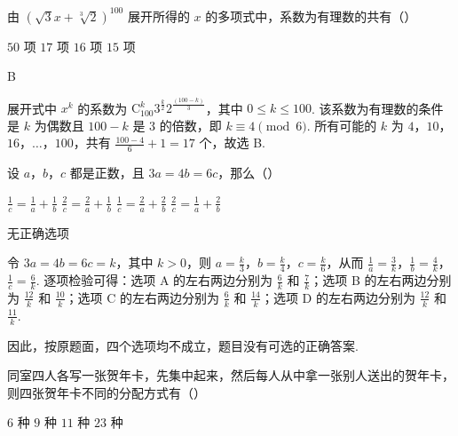 \begin{problem}
由 \((\sqrt{3}x + \sqrt[3]{2})^{100}\) 展开所得的 \(x\) 的多项式中，系数为有理数的共有（\quad）

\choices
    {\(50\) 项}
    {\(17\) 项}
    {\(16\) 项}
    {\(15\) 项}
\end{problem}

\begin{answer}
B
\end{answer}

\begin{solution}
展开式中 \(x^k\) 的系数为
\(\mathrm C_{100}^{k}3^{\frac{k}{2}}2^{\frac{(100-k)}{3}}\)，其中 \(0\leqslant k\leqslant100\). 该系数为有理数的条件是
\(k\) 为偶数且 \(100-k\) 是 \(3\) 的倍数，即 \(k\equiv4\pmod 6\). 所有可能的 \(k\) 为
\(4\)，\(10\)，\(16\)，\(\dots\)，\(100\)，共有
\(\frac{100-4}{6}+1=17\) 个，故选 B.
\end{solution}

\begin{problem}
设 \(a\)，\(b\)，\(c\) 都是正数，且 \(3a = 4b = 6c\)，那么（\quad）

\choices
    {\(\frac{1}{c} = \frac{1}{a} + \frac{1}{b}\)}
    {\(\frac{2}{c} = \frac{2}{a} +\frac{1}{b}\)}
    {\(\frac{1}{c} = \frac{2}{a} +\frac{2}{b}\)}
    {\(\frac{2}{c} = \frac{1}{a} +\frac{2}{b}\)}
\end{problem}

\begin{answer}
无正确选项
\end{answer}

\begin{solution}
令 \(3a=4b=6c=k\)，其中 \(k>0\)，则
\(a=\frac{k}{3}\)，\(b=\frac{k}{4}\)，\(c=\frac{k}{6}\)，从而
\(\frac{1}{a}=\frac{3}{k}\)，\(\frac{1}{b}=\frac{4}{k}\)，\(\frac{1}{c}=\frac{6}{k}\).
逐项检验可得：选项 A 的左右两边分别为 \(\frac{6}{k}\) 和 \(\frac{7}{k}\)；选项 B 的左右两边分别为 \(\frac{12}{k}\) 和 \(\frac{10}{k}\)；选项 C 的左右两边分别为 \(\frac{6}{k}\) 和 \(\frac{14}{k}\)；选项 D 的左右两边分别为 \(\frac{12}{k}\) 和 \(\frac{11}{k}\).

因此，按原题面，四个选项均不成立，题目没有可选的正确答案.
\end{solution}

\begin{problem}
同室四人各写一张贺年卡，先集中起来，然后每人从中拿一张别人送出的贺年卡，则四张贺年卡不同的分配方式有（\quad）

\choices
    {\(6\) 种}
    {\(9\) 种}
    {\(11\) 种}
    {\(23\) 种}
\end{problem}

